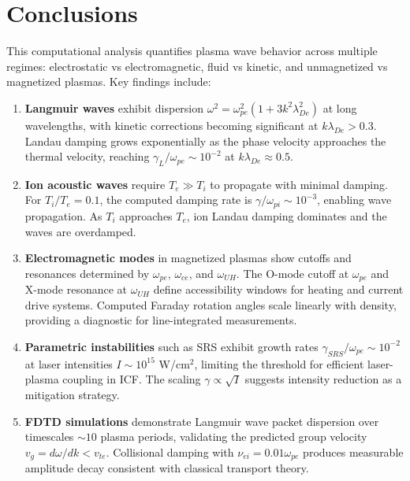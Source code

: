 \documentclass[11pt,a4paper]{article}
\begin{document}
\section{Conclusions}

This computational analysis quantifies plasma wave behavior across multiple regimes: electrostatic vs electromagnetic, fluid vs kinetic, and unmagnetized vs magnetized plasmas. Key findings include:

\begin{enumerate}
\item \textbf{Langmuir waves} exhibit dispersion $\omega^2 = \omega_{pe}^2(1 + 3k^2\lambda_{De}^2)$ at long wavelengths, with kinetic corrections becoming significant at $k\lambda_{De} > 0.3$. Landau damping grows exponentially as the phase velocity approaches the thermal velocity, reaching $\gamma_L/\omega_{pe} \sim 10^{-2}$ at $k\lambda_{De} \approx 0.5$.

\item \textbf{Ion acoustic waves} require $T_e \gg T_i$ to propagate with minimal damping. For $T_i/T_e = 0.1$, the computed damping rate is $\gamma/\omega_{pi} \sim 10^{-3}$, enabling wave propagation. As $T_i$ approaches $T_e$, ion Landau damping dominates and the waves are overdamped.

\item \textbf{Electromagnetic modes} in magnetized plasmas show cutoffs and resonances determined by $\omega_{pe}$, $\omega_{ce}$, and $\omega_{UH}$. The O-mode cutoff at $\omega_{pe}$ and X-mode resonance at $\omega_{UH}$ define accessibility windows for heating and current drive systems. Computed Faraday rotation angles scale linearly with density, providing a diagnostic for line-integrated measurements.

\item \textbf{Parametric instabilities} such as SRS exhibit growth rates $\gamma_{SRS}/\omega_{pe} \sim 10^{-2}$ at laser intensities $I \sim 10^{15}$ W/cm$^2$, limiting the threshold for efficient laser-plasma coupling in ICF. The scaling $\gamma \propto \sqrt{I}$ suggests intensity reduction as a mitigation strategy.

\item \textbf{FDTD simulations} demonstrate Langmuir wave packet dispersion over timescales $\sim 10$ plasma periods, validating the predicted group velocity $v_g = d\omega/dk < v_{te}$. Collisional damping with $\nu_{ei} = 0.01\omega_{pe}$ produces measurable amplitude decay consistent with classical transport theory.
\end{enumerate}
\end{document}
